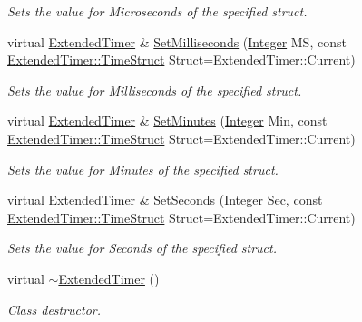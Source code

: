 \begin{DoxyCompactItemize}
\begin{DoxyCompactList}\small\item\em Sets the value for Microseconds of the specified struct. \item\end{DoxyCompactList}\item 
virtual \hyperlink{classphys_1_1ExtendedTimer}{ExtendedTimer} \& \hyperlink{classphys_1_1ExtendedTimer_ab64ddc2dc49d4daf9b0e5a33dc9dc68a}{SetMilliseconds} (\hyperlink{namespacephys_a7f09bf5585b2bb97613cd9aad4273a81}{Integer} MS, const \hyperlink{classphys_1_1ExtendedTimer_a0f316e9347d1c118a157cc3c737c554b}{ExtendedTimer::TimeStruct} Struct=ExtendedTimer::Current)
\begin{DoxyCompactList}\small\item\em Sets the value for Milliseconds of the specified struct. \item\end{DoxyCompactList}\item 
virtual \hyperlink{classphys_1_1ExtendedTimer}{ExtendedTimer} \& \hyperlink{classphys_1_1ExtendedTimer_a780114f83344b2cd15a558f054b4e8e8}{SetMinutes} (\hyperlink{namespacephys_a7f09bf5585b2bb97613cd9aad4273a81}{Integer} Min, const \hyperlink{classphys_1_1ExtendedTimer_a0f316e9347d1c118a157cc3c737c554b}{ExtendedTimer::TimeStruct} Struct=ExtendedTimer::Current)
\begin{DoxyCompactList}\small\item\em Sets the value for Minutes of the specified struct. \item\end{DoxyCompactList}\item 
virtual \hyperlink{classphys_1_1ExtendedTimer}{ExtendedTimer} \& \hyperlink{classphys_1_1ExtendedTimer_ad9303e618cb0ea171441d595eb5a3e55}{SetSeconds} (\hyperlink{namespacephys_a7f09bf5585b2bb97613cd9aad4273a81}{Integer} Sec, const \hyperlink{classphys_1_1ExtendedTimer_a0f316e9347d1c118a157cc3c737c554b}{ExtendedTimer::TimeStruct} Struct=ExtendedTimer::Current)
\begin{DoxyCompactList}\small\item\em Sets the value for Seconds of the specified struct. \item\end{DoxyCompactList}\item 
\hypertarget{classphys_1_1ExtendedTimer_a7a9ce42ffda17cbe366adde1688120af}{
virtual \hyperlink{classphys_1_1ExtendedTimer_a7a9ce42ffda17cbe366adde1688120af}{$\sim$ExtendedTimer} ()}
\label{classphys_1_1ExtendedTimer_a7a9ce42ffda17cbe366adde1688120af}

\begin{DoxyCompactList}\small\item\em Class destructor. \item\end{DoxyCompactList}\end{DoxyCompactItemize}
